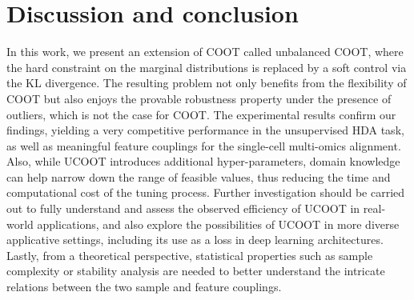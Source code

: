 \section{Discussion and conclusion}
\label{sec:conclusion}

In this work, we present an extension of COOT called unbalanced COOT,
where the hard constraint on the marginal distributions is replaced by a soft control via
the KL divergence. The resulting problem not only benefits from the flexibility of COOT
but also enjoys the provable robustness property under the presence of outliers,
which is not the case for COOT. The experimental results confirm our findings,
yielding a very competitive performance in the unsupervised HDA task, as well as
meaningful feature couplings for the single-cell multi-omics alignment. Also,
while UCOOT introduces additional hyper-parameters, domain knowledge can help narrow down
the range of feasible values, thus reducing the time and computational cost of the tuning process.
Further investigation should be carried out to fully understand and assess
the observed efficiency of UCOOT in real-world applications,
and also explore the possibilities of UCOOT in more diverse applicative settings,
including its use as a loss in deep learning architectures.
Lastly, from a theoretical perspective, statistical properties such as
sample complexity or stability analysis are needed to better understand
the intricate relations between the two sample and feature couplings.

